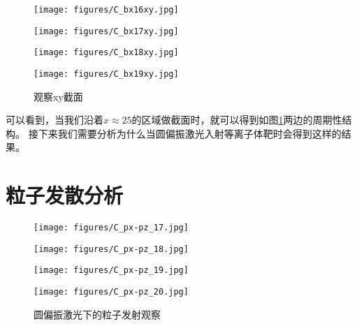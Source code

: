 \begin{figure}[H]
    \begin{minipage}[t]{0.5\linewidth}
        \centering
        \texttt{[image: figures/C\_bx16xy.jpg]}
        \label{fig:side_C_bxyy:a}
    \end{minipage}%
    \begin{minipage}[t]{0.5\linewidth}
        \centering
        \texttt{[image: figures/C\_bx17xy.jpg]}
        \label{fig:side_C_bxyy:b}
    \end{minipage}
    \begin{minipage}[t]{0.5\linewidth}
        \centering
        \texttt{[image: figures/C\_bx18xy.jpg]}
        \label{fig:side_C_bxyy:c}
    \end{minipage}%
    \begin{minipage}[t]{0.5\linewidth}
        \centering
        \texttt{[image: figures/C\_bx19xy.jpg]}
        \label{fig:side_C_bxyy:d}
    \end{minipage}
    \caption{观察xy截面}
    \label{fig:combined_C_bxyy}

\end{figure}

可以看到，当我们沿着$x \approx 25$的区域做截面时，就可以得到如图\ref{fig:combined_C_bxyy}两边的周期性结构。
接下来我们需要分析为什么当圆偏振激光入射等离子体靶时会得到这样的结果。

\section[\textnormal{粒子发散分析}]{\textbf{粒子发散分析}}

\begin{figure}[H]
    \begin{minipage}[t]{0.5\linewidth}
        \centering
        \texttt{[image: figures/C\_px-pz\_17.jpg]}
        \label{fig:side_C_pxpz:a}
    \end{minipage}%
    \begin{minipage}[t]{0.5\linewidth}
        \centering
        \texttt{[image: figures/C\_px-pz\_18.jpg]}
        \label{fig:side_C_pxpz:b}
    \end{minipage}
    \begin{minipage}[t]{0.5\linewidth}
        \centering
        \texttt{[image: figures/C\_px-pz\_19.jpg]}
        \label{fig:side_C_pxpz:c}
    \end{minipage}%
    \begin{minipage}[t]{0.5\linewidth}
        \centering
        \texttt{[image: figures/C\_px-pz\_20.jpg]}
        \label{fig:side_C_pxpz:d}
    \end{minipage}
    \caption{圆偏振激光下的粒子发射观察}
    \label{fig:combined_C_pxpz}

\end{figure}


